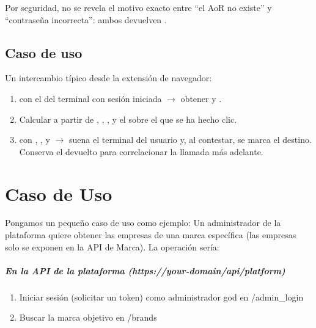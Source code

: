 \documentclass[letterpaper,10pt,spanish]{sphinxmanual}
\begin{document}
Por seguridad, no se revela el motivo exacto entre ``el AoR no existe'' y ``contraseña incorrecta'': ambos devuelven .


\section{Caso de uso}
\label{api_rest/click2call:use-case}
Un intercambio típico desde la extensión de navegador:
\begin{enumerate}
\item {} 
 con el  del terminal con sesión iniciada \(\rightarrow\) obtener  y .

\item {} 
Calcular  a partir de , , ,  y el  sobre el que se ha hecho clic.

\item {} 
 con , ,  y  \(\rightarrow\) suena el terminal del usuario y, al contestar, se marca el destino. Conserva el  devuelto para correlacionar la llamada más adelante.

\end{enumerate}


\chapter{Caso de Uso}
\label{api_rest/use_case:use-case}\label{api_rest/use_case::doc}\label{api_rest/use_case:id1}
Pongamos un pequeño caso de uso como ejemplo: Un administrador de la plataforma quiere obtener las empresas de una marca específica (las empresas solo se exponen en la API de Marca). La operación sería:
\paragraph{En la API de la plataforma (https://your-domain/api/platform)}
\begin{enumerate}
\item {} 
Iniciar sesión (solicitar un token) como administrador god en /admin\_login

\item {} 
Buscar la marca objetivo en /brands

\end{enumerate}
\end{document}

